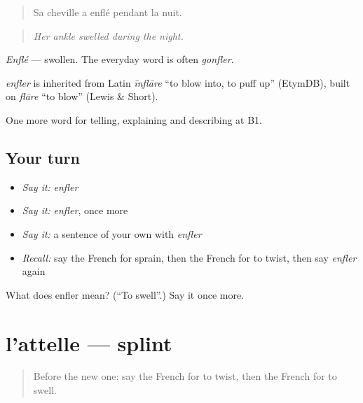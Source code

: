 \begin{quote}
Sa cheville a enflé pendant la nuit.
\end{quote}

\begin{quote}
\emph{Her ankle swelled during the night.}
\end{quote}

\emph{Enflé} — swollen. The everyday word is often \emph{gonfler}.

\begin{cousinweb}
\emph{enfler} is inherited from Latin \emph{īnflāre} \textquotedblleft{}to blow into, to puff up\textquotedblright{} (EtymDB), built on \emph{flāre} \textquotedblleft{}to blow\textquotedblright{} (Lewis \& Short).
\end{cousinweb}

\begin{grammarlens}[title={What you've built}]
One more word for telling, explaining and describing at B1.
\end{grammarlens}

\subsection*{Your turn}
\begin{itemize}
\raggedright
  \item \emph{Say it:} \emph{enfler}
  \item \emph{Say it:} \emph{enfler}, once more
  \item \emph{Say it:} a sentence of your own with \emph{enfler}
  \item \emph{Recall:} say the French for sprain, then the French for to twist, then say \emph{enfler} again
\end{itemize}

\begin{tcolorbox}[breakable,colback=teal!4,colframe=teal!35!black,title={Before you move on}]
What does enfler mean? (\textquotedblleft{}To swell\textquotedblright{}.) Say it once more.
\end{tcolorbox}
\section[l'attelle]{l'attelle — splint}

\label{lesson:FR-C481-attelle}



\begin{quote}
Before the new one: say the French for to twist, then the French for to swell.
\end{quote}

